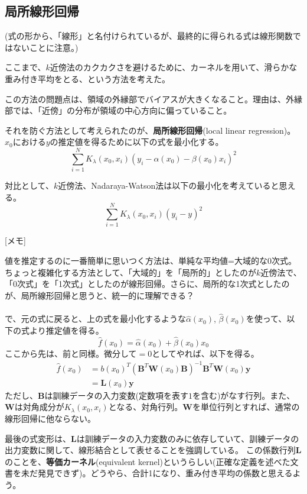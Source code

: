\documentclass{jsarticle}
\begin{document}
\subsection{局所線形回帰}
(式の形から、「線形」と名付けられているが、最終的に得られる式は線形関数ではないことに注意。)

ここまで、$k$近傍法のカクカクさを避けるために、カーネルを用いて、滑らかな重み付き平均をとる、という方法を考えた。

この方法の問題点は、領域の外縁部でバイアスが大きくなること。理由は、外縁部では、「近傍」の分布が領域の中心方向に偏っていること。

それを防ぐ方法として考えられたのが、\textbf{局所線形回帰}(local linear regression)。$x_{0}$における$y$の推定値を得るために以下の式を最小化する。
\[
  \sum_{i=1}^{N}K_{\lambda}(x_{0},x_{i})(y_{i}- \alpha (x_{0})- \beta (x_{0})x_{i})^{2}
\]

対比として、$k$近傍法、Nadaraya-Watson法は以下の最小化を考えていると思える。
\[
  \sum_{i=1}^{N}K_{\lambda}(x_{0},x_{i})(y_{i}- y)^{2}
\]

[メモ]

値を推定するのに一番簡単に思いつく方法は、単純な平均値=大域的な0次式。ちょっと複雑化する方法として、「大域的」を「局所的」としたのが$k$近傍法で、「0次式」を「1次式」としたのが線形回帰。さらに、局所的な1次式としたのが、局所線形回帰と思うと、統一的に理解できる？\\\\

で、元の式に戻ると、上の式を最小化するような$\hat{\alpha}(x_{0})$, $\hat{\beta}(x_{0})$を使って、以下の式より推定値を得る。
\[
  \hat{f}(x_{0})=\hat{\alpha}(x_{0})+\hat{\beta}(x_{0})x_{0}
\]
ここから先は、前と同様。微分して$=0$としてやれば、以下を得る。
\begin{align}
  \hat{f}(x_{0})&=b(x_{0})^{T}(\mathbf{B}^{T}\mathbf{W}(x_{0})\mathbf{B})^{-1}\mathbf{B}^{T}\mathbf{W}(x_{0})\mathbf{y} \\
  &=\mathbf{L}(x_{0})\mathbf{y}
\end{align}
ただし、$\mathbf{B}$は訓練データの入力変数(定数項を表す$1$を含む)がなす行列。また、$\mathbf{W}$は対角成分が$K_{\lambda}(x_{0},x_{i})$となる、対角行列。$\mathbf{W}$を単位行列とすれば、通常の線形回帰に他ならない。

最後の式変形は、$\mathbf{L}$は訓練データの入力変数のみに依存していて、訓練データの出力変数に関して、線形結合として表せることを強調している。
この係数行列$\mathbf{L}$のことを、\textbf{等価カーネル}(equivalent kernel)というらしい(正確な定義を述べた文書を未だ発見できず)。どうやら、合計1になり、重み付き平均の係数と思えるよう。
\end{document}
